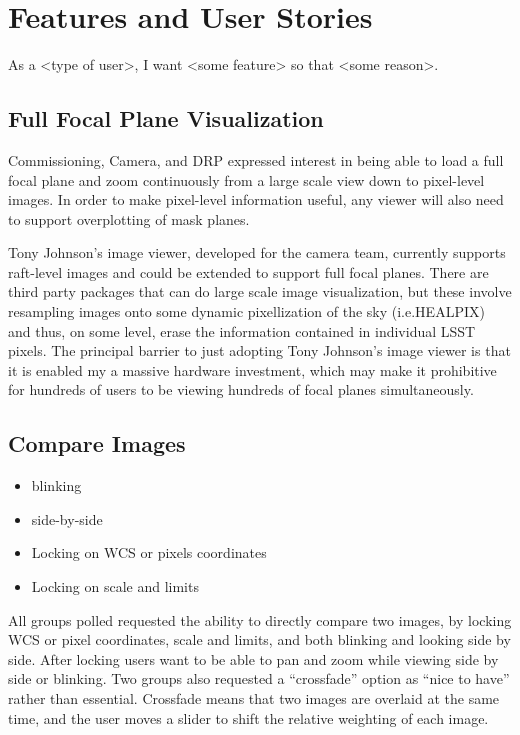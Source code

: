 \section{Features and User Stories}
\label{sec:features}

As a <type of user>, I want <some feature> so that <some reason>. 

\subsection{Full Focal Plane Visualization}

Commissioning, Camera, and DRP expressed interest in being able to load a full focal plane and zoom continuously
from a large scale view down to pixel-level images.  In order to make pixel-level information useful, any
viewer will also need to support overplotting of mask planes.

Tony Johnson's image viewer, developed for the camera team, currently supports raft-level images and could be
extended to support full focal planes.  There are third party packages that can do large scale image
visualization, but these involve resampling images onto some dynamic pixellization of the sky (i.e.HEALPIX) and
thus, on some level, erase the information contained in individual LSST pixels.  The principal barrier to just
adopting Tony Johnson's image viewer is that it is enabled my a massive hardware investment, which may make it
prohibitive for hundreds of users to be viewing hundreds of focal planes simultaneously.

\subsection{Compare Images}
\begin{itemize}
\item{blinking}
\item{side-by-side}
\item{Locking on WCS or pixels coordinates}
\item{Locking on scale and limits}
\end{itemize}

All groups polled requested the ability to directly compare two images, by locking WCS or pixel coordinates, scale and limits, and both blinking and looking side by side.
After locking users want to be able to pan and zoom while viewing side by side or blinking.
Two groups also requested a ``crossfade'' option as ``nice to have'' rather than essential.
Crossfade means that two images are overlaid at the same time, and the user moves a slider to shift the relative weighting of each image.

